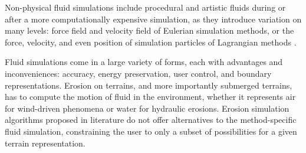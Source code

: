 Non-physical fluid simulations include procedural and artistic fluids during or after a more computationally expensive simulation, as they introduce variation on many levels: force field and velocity field of Eulerian simulation methods, or the force, velocity, and even position of simulation particles of Lagrangian methods \cite{Sims1990}.




\midConclusion

Fluid simulations come in a large variety of forms, each with advantages and inconveniences: accuracy, energy preservation, user control, and boundary representations. Erosion on terrains, and more importantly submerged terrains, has to compute the motion of fluid in the environment, whether it represents air for wind-driven phenomena or water for hydraulic erosions. Erosion simulation algorithms proposed in literature do not offer alternatives to the method-specific fluid simulation, constraining the user to only a subset of possibilities for a given terrain representation.
